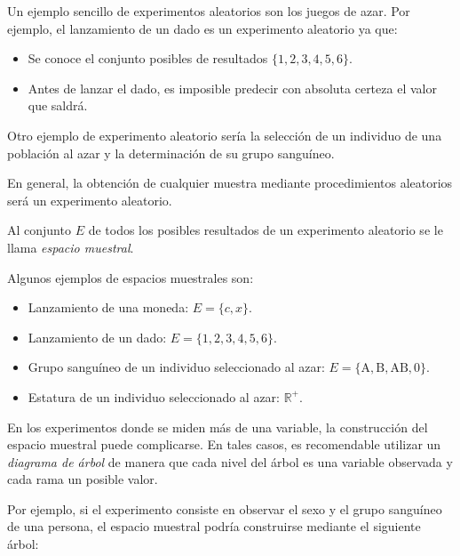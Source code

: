 Un ejemplo sencillo de experimentos aleatorios son los juegos de azar.
Por ejemplo, el lanzamiento de un dado es un experimento aleatorio ya que:
\begin{itemize}[label=--]
\item Se conoce el conjunto posibles de resultados $\{1,2,3,4,5,6\}$.
\item Antes de lanzar el dado, es imposible predecir con absoluta certeza el valor que saldrá. 
\end{itemize}

Otro ejemplo de experimento aleatorio sería la selección de un individuo de una población al azar y la determinación de su grupo sanguíneo.

En general, la obtención de cualquier muestra mediante procedimientos aleatorios será un experimento aleatorio.  

\begin{definicion}
Al conjunto $E$ de todos los posibles resultados de un experimento aleatorio se le llama \emph{espacio muestral}.
\end{definicion}

Algunos ejemplos de espacios muestrales son:
\begin{itemize}
\item Lanzamiento de una moneda: $E=\{c,x\}$.
\item Lanzamiento de un dado: $E=\{1,2,3,4,5,6\}$.
\item Grupo sanguíneo de un individuo seleccionado al azar: $E=\{\mbox{A},\mbox{B},\mbox{AB},\mbox{0}\}$.
\item Estatura de un individuo seleccionado al azar: $\mathbb{R}^+$.
\end{itemize}

En los experimentos donde se miden más de una variable, la construcción del espacio muestral puede complicarse.
En tales casos, es recomendable utilizar un \emph{diagrama de árbol} de manera que cada nivel del árbol es una variable
observada y cada rama un posible valor.

Por ejemplo, si el experimento consiste en observar el sexo y el grupo sanguíneo de una persona, el espacio muestral podría construirse
mediante el siguiente árbol:

\begin{center}
\renewcommand{\psedge}[2]{\ncdiag[armA=0.7cm,angleA=180,angleB=0,armB=0cm]{#2}{#1}} 
\end{center}

